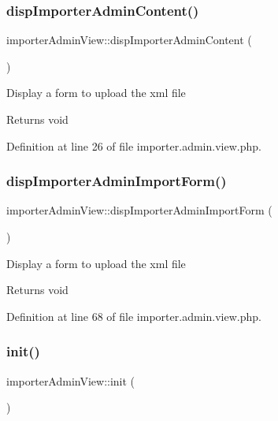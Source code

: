\subsubsection{\texorpdfstring{disp\+Importer\+Admin\+Content()}{dispImporterAdminContent()}}
{\footnotesize\ttfamily importer\+Admin\+View\+::disp\+Importer\+Admin\+Content (\begin{DoxyParamCaption}{ }\end{DoxyParamCaption})}

Display a form to upload the xml file \begin{DoxyReturn}{Returns}
void 
\end{DoxyReturn}


Definition at line 26 of file importer.\+admin.\+view.\+php.

\hypertarget{classimporterAdminView_a5b4fa9f27407cc697b65505fafa4fc11}{}\label{classimporterAdminView_a5b4fa9f27407cc697b65505fafa4fc11} 
\subsubsection{\texorpdfstring{disp\+Importer\+Admin\+Import\+Form()}{dispImporterAdminImportForm()}}
{\footnotesize\ttfamily importer\+Admin\+View\+::disp\+Importer\+Admin\+Import\+Form (\begin{DoxyParamCaption}{ }\end{DoxyParamCaption})}

Display a form to upload the xml file \begin{DoxyReturn}{Returns}
void 
\end{DoxyReturn}


Definition at line 68 of file importer.\+admin.\+view.\+php.

\hypertarget{classimporterAdminView_a80f9a6e2e9051598556993dcbbe8027d}{}\label{classimporterAdminView_a80f9a6e2e9051598556993dcbbe8027d} 
\subsubsection{\texorpdfstring{init()}{init()}}
{\footnotesize\ttfamily importer\+Admin\+View\+::init (\begin{DoxyParamCaption}{ }\end{DoxyParamCaption})}

